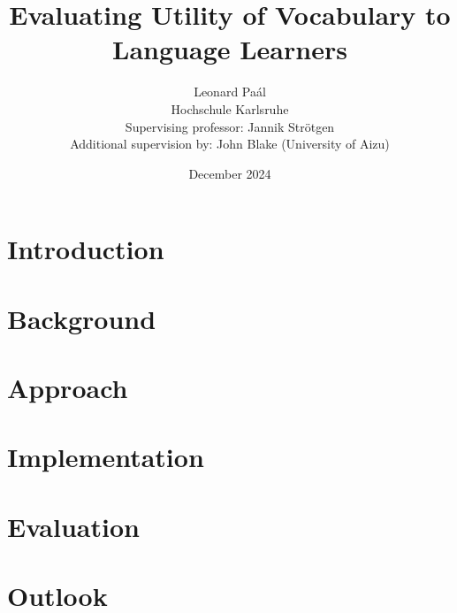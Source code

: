 \documentclass[12pt]{report}
\title{Evaluating Utility of Vocabulary to Language Learners}
\author{Leonard Paál\\Hochschule Karlsruhe\\Supervising professor: Jannik Strötgen\\Additional supervision by: John Blake (University of Aizu)}
\date{December 2024}
\begin{document}
\maketitle
\begin{abstract}
	\noindent [Abstract]
\end{abstract}

\clearpage
\tableofcontents
\clearpage

\chapter{Introduction} \label{ch:intro}

\chapter{Background} \label{ch:background}

\chapter{Approach} \label{ch:approach}

\chapter{Implementation} \label{ch:implementation}

\chapter{Evaluation} \label{ch:evaluation}

\chapter{Outlook} \label{ch:outlook}


% 



\end{document}
